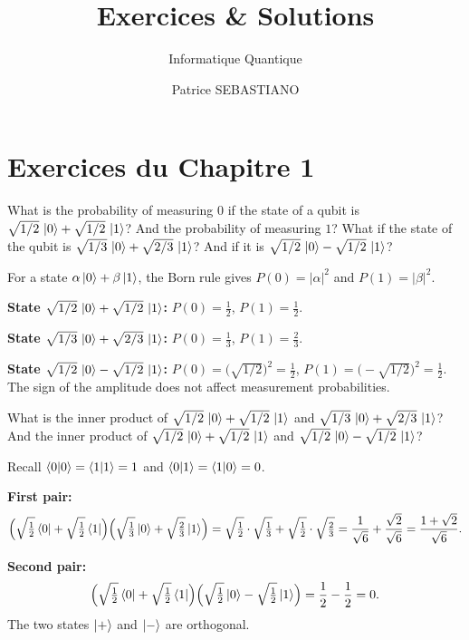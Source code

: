\documentclass{ceri/sty/rapport}
\title{Exercices \& Solutions}
\subtitle{Informatique Quantique}
\author{
	Patrice SEBASTIANO
}
\newcounter{exercice}[section]
\begin{document}
\maketitle
\sloppy


\section{Exercices du Chapitre 1}
\label{sec:chap1}

\begin{exercice}[p.~11]
What is the probability of measuring $0$ if the state of a qubit is
$\sqrt{1/2}\,\ket{0} + \sqrt{1/2}\,\ket{1}$?
And the probability of measuring $1$?
What if the state of the qubit is $\sqrt{1/3}\,\ket{0} + \sqrt{2/3}\,\ket{1}$?
And if it is $\sqrt{1/2}\,\ket{0} - \sqrt{1/2}\,\ket{1}$?
\end{exercice}

\begin{solution}
For a state $\alpha\ket{0}+\beta\ket{1}$, the Born rule gives $P(0)=|\alpha|^2$ and
$P(1)=|\beta|^2$.

\medskip\noindent
\textbf{State $\sqrt{1/2}\,\ket{0}+\sqrt{1/2}\,\ket{1}$:}
$P(0)=\tfrac{1}{2}$, $P(1)=\tfrac{1}{2}$.

\medskip\noindent
\textbf{State $\sqrt{1/3}\,\ket{0}+\sqrt{2/3}\,\ket{1}$:}
$P(0)=\tfrac{1}{3}$, $P(1)=\tfrac{2}{3}$.

\medskip\noindent
\textbf{State $\sqrt{1/2}\,\ket{0}-\sqrt{1/2}\,\ket{1}$:}
$P(0)=\bigl(\sqrt{1/2}\bigr)^2=\tfrac{1}{2}$, $P(1)=\bigl(-\sqrt{1/2}\bigr)^2=\tfrac{1}{2}$.
The sign of the amplitude does not affect measurement probabilities.
\end{solution}

\begin{exercice}[p.~13]
What is the inner product of $\sqrt{1/2}\,\ket{0} + \sqrt{1/2}\,\ket{1}$ and
$\sqrt{1/3}\,\ket{0} + \sqrt{2/3}\,\ket{1}$?
And the inner product of $\sqrt{1/2}\,\ket{0} + \sqrt{1/2}\,\ket{1}$ and
$\sqrt{1/2}\,\ket{0} - \sqrt{1/2}\,\ket{1}$?
\end{exercice}

\begin{solution}
Recall $\braket{0|0}=\braket{1|1}=1$ and $\braket{0|1}=\braket{1|0}=0$.

\medskip\noindent
\textbf{First pair:}
\[
  \Bigl(\sqrt{\tfrac{1}{2}}\bra{0}+\sqrt{\tfrac{1}{2}}\bra{1}\Bigr)
  \Bigl(\sqrt{\tfrac{1}{3}}\ket{0}+\sqrt{\tfrac{2}{3}}\ket{1}\Bigr)
  = \sqrt{\tfrac{1}{2}}\cdot\sqrt{\tfrac{1}{3}} + \sqrt{\tfrac{1}{2}}\cdot\sqrt{\tfrac{2}{3}}
  = \frac{1}{\sqrt{6}} + \frac{\sqrt{2}}{\sqrt{6}}
  = \frac{1+\sqrt{2}}{\sqrt{6}}.
\]

\medskip\noindent
\textbf{Second pair:}
\[
  \Bigl(\sqrt{\tfrac{1}{2}}\bra{0}+\sqrt{\tfrac{1}{2}}\bra{1}\Bigr)
  \Bigl(\sqrt{\tfrac{1}{2}}\ket{0}-\sqrt{\tfrac{1}{2}}\ket{1}\Bigr)
  = \frac{1}{2} - \frac{1}{2} = 0.
\]
The two states $\ket{+}$ and $\ket{-}$ are orthogonal.
\end{solution}
\end{document}
